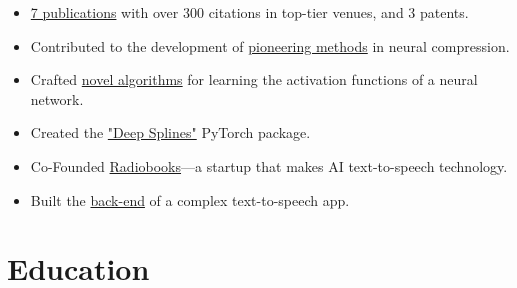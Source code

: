 \documentclass[a4paper,11pt]{article}
\begin{document}
    \begin{itemize}[leftmargin=*,noitemsep]
      \item \href{https://www.joaquimcampos.com/pubs.html}{7 publications} with over 300 citations in top-tier venues, and 3 patents.
      \item Contributed to the development of \href{https://www.joaquimcampos.com/compression.html}{pioneering methods} in neural compression.
      \item Crafted \href{https://www.joaquimcampos.com/deepsplines.html}{novel algorithms} for
      learning the activation functions of a neural network.
      \item Created the \href{https://pypi.org/project/deepsplines/}{"Deep Splines"} PyTorch package.
      \item Co-Founded \href{https://radiobooks.webflow.io/}{Radiobooks}—a startup that makes AI text-to-speech technology.
      \item Built the \href{https://github.com/joaquimcampos/radiobooks-sample}{back-end} of a complex text-to-speech app.
    \end{itemize}

  \vspace{16pt}

  \section{Education}
\end{document}
